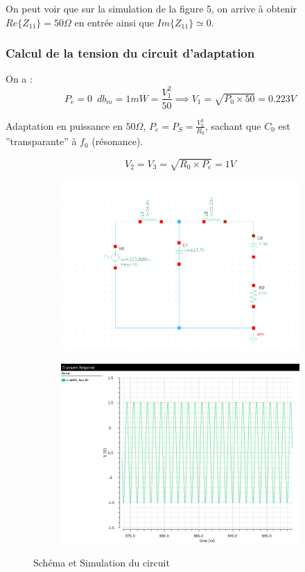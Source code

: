 \documentclass[a4paper]{article}
\begin{document}
On peut voir que sur la simulation de la figure 5, on arrive \`a obtenir $Re\{Z_{11}\} = 50 \Omega$ en entr\'ee ainsi que
 $Im\{Z_{11}\} \simeq 0$.

\subsubsection{Calcul de la tension du circuit d'adaptation}
On a :
\[
P_e = 0 \phantom{4} db_{m} = 1 mW = \frac{V^2_1}{50} \implies V_1 = \sqrt{P_0 \times 50} = 0.223 V
\]

Adaptation en puissance en $50 \Omega$, $ P_e = P_S = \frac{V^2_2}{R_0}$, sachant que $C_0$ est ''transparante'' \`a $f_0$ (r\'esonance).

\clearpage
\[
  V_2 = V_3 = \sqrt{R_0 \times P_e} = 1 V
\]

\iffalse
\begin{figure}[!htb]
  \centering
  \begin{subfigure}[t]{.5\linewidth}
      \centering
      \includegraphics[width=1\linewidth]{V-Adaptation.png}
      \label{fig:Adaptation-V}
  \end{subfigure}%
  \begin{subfigure}[t]{.5\linewidth}
    \centering
    \includegraphics[width=1\linewidth]{V-Adaptation-sim.png}
    \label{fig:Adaptation-V-sim}
  \end{subfigure}%
  \caption{Sch\'ema et Simulation du circuit}
  \label{fig:Adaptation-sim}
\end{figure}
\end{document}

